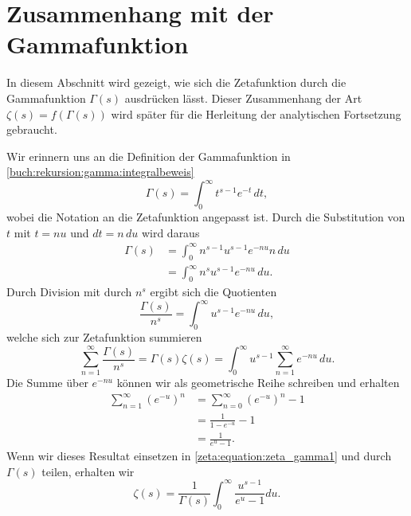 \section{Zusammenhang mit der Gammafunktion} \label{zeta:section:zusammenhang_mit_gammafunktion}

In diesem Abschnitt wird gezeigt, wie sich die Zetafunktion durch die Gammafunktion $\Gamma(s)$ ausdrücken lässt.
Dieser Zusammenhang der Art $\zeta(s) = f(\Gamma(s))$ wird später für die Herleitung der analytischen Fortsetzung gebraucht.

Wir erinnern uns an die Definition der Gammafunktion in \eqref{buch:rekursion:gamma:integralbeweis}
\begin{equation*}
    \Gamma(s)
    =
    \int_0^{\infty} t^{s-1} e^{-t} \,dt,
\end{equation*}
wobei die Notation an die Zetafunktion angepasst ist.
Durch die Substitution von $t$ mit $t = nu$ und $dt = n\,du$ wird daraus
\begin{align*}
    \Gamma(s)
    &=
    \int_0^{\infty} n^{s-1}u^{s-1} e^{-nu} n \,du \\
    &=
    \int_0^{\infty} n^s u^{s-1} e^{-nu} \,du.
\end{align*}
Durch Division mit durch $n^s$ ergibt sich die Quotienten
\begin{equation*}
    \frac{\Gamma(s)}{n^s}
    =
    \int_0^{\infty} u^{s-1} e^{-nu} \,du,
\end{equation*}
welche sich zur Zetafunktion summieren
\begin{equation}
    \sum_{n=1}^{\infty} \frac{\Gamma(s)}{n^s}
    =
    \Gamma(s) \zeta(s)
    =
    \int_0^{\infty} u^{s-1}
    \sum_{n=1}^{\infty}e^{-nu}
    \,du.
    \label{zeta:equation:zeta_gamma1}
\end{equation}
Die Summe über $e^{-nu}$ können wir als geometrische Reihe schreiben und erhalten
\begin{align}
    \sum_{n=1}^{\infty}\left(e^{-u}\right)^n
    &=
    \sum_{n=0}^{\infty}\left(e^{-u}\right)^n
    -
    1
    \\
    &=
    \frac{1}{1 - e^{-u}} - 1
    \\
    &=
    \frac{1}{e^u - 1}.
\end{align}
Wenn wir dieses Resultat einsetzen in \eqref{zeta:equation:zeta_gamma1} und durch $\Gamma(s)$ teilen, erhalten wir %
\begin{equation}\label{zeta:equation:zeta_gamma_final}
    \zeta(s)
    =
    \frac{1}{\Gamma(s)}
    \int_0^{\infty}
    \frac{u^{s-1}}{e^u -1}
    du.
\end{equation}
